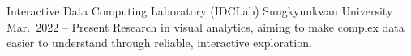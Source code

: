 \begin{cventries}
  \cventry
    {Interactive Data Computing Laboratory (IDCLab)}
    {Sungkyunkwan University}
    {Mar.\ 2022 – Present}
    {}
    {Research in visual analytics, aiming to make complex data easier to understand through reliable, interactive exploration.}
\end{cventries}
